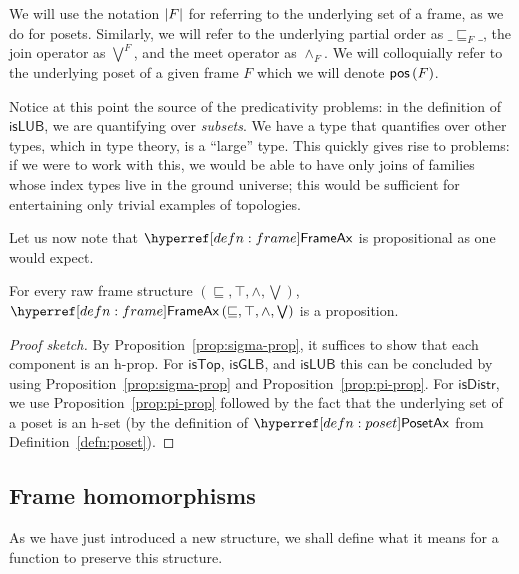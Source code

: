 We will use the notation $\left| F \right|$ for referring to the underlying set of a frame, as we
do for posets. Similarly, we will refer to the underlying partial order as $\_\sqsubseteq_F\_$, the
join operator as $\bigvee^F$, and the meet operator as $\wedge_F$. We will colloquially refer to the
underlying poset of a given frame $F$ which we will denote $\mathsf{pos}\left(F\right)$.

Notice at this point the source of the predicativity problems: in the definition of
$\mathsf{isLUB}$, we are quantifying over \emph{subsets}. We have a type that quantifies
over other types, which in type theory, is a ``large'' type. This quickly gives rise to
problems: if we were to work with this, we would be able to have only joins of families
whose index types live in the ground universe; this would be sufficient for entertaining
only trivial examples of topologies.

Let us now note that $\frameaxnm{}$ is propositional as one would expect.
\begin{prop}\label{prop:frame-ax-prop}
  For every raw frame structure $(\sqsubseteq, \top, \wedge, \bigvee)$, $\frameax{\sqsubseteq, \top, \wedge, \bigvee}$ is a proposition.
\end{prop}
\begin{proof}[Proof sketch]
  By Proposition~\ref{prop:sigma-prop}, it suffices to show that each component is an
  h-prop. For $\mathsf{isTop}$, $\mathsf{isGLB}$, and $\mathsf{isLUB}$ this can be
  concluded by using Proposition~\ref{prop:sigma-prop} and Proposition~\ref{prop:pi-prop}.
  For $\mathsf{isDistr}$, we use Proposition~\ref{prop:pi-prop} followed by the fact that
  the underlying set of a poset is an h-set (by the definition of $\posetaxnm{}$ from
  Definition~\ref{defn:poset}).
\end{proof}

\subsection{Frame homomorphisms}

As we have just introduced a new structure, we shall define what it means for a function
to preserve this structure.

